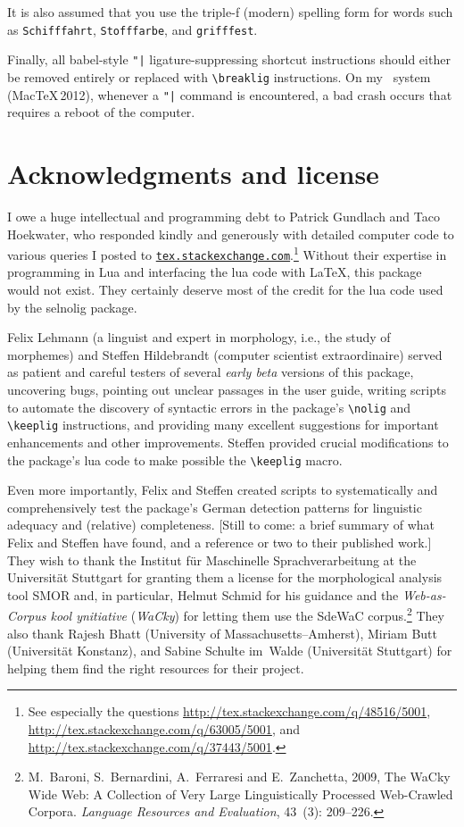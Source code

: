 \documentclass[12pt]{article}
\newcommand{\pkg}[1]{\textsf{#1}}
\newcommand{\cmmd}[1]{\texttt{\textbackslash #1}}
\begin{document}
It is also assumed that you use the triple-f (modern) spelling form for words such as \texttt{Schifffahrt}, \texttt{Stofffarbe}, and \texttt{grifffest}.

Finally, all \pkg{babel}-style \Verb+"|+ ligature-suppressing shortcut instructions should either be removed entirely or replaced with \Verb+\breaklig+ instructions. On my \LuaLaTeX\ system (MacTeX\,2012), whenever a \Verb+"|+ command is encountered, a bad crash occurs that requires a reboot of the computer.


\section{Acknowledgments and license}

I owe a huge intellectual and programming debt to Patrick Gundlach and Taco Hoekwater, who responded kindly and generously with detailed computer code to various queries I posted to \href{http://tex.stackexchange.com}{\texttt{tex.stackexchange.com}}.\footnote{See especially the questions \url{http://tex.stackexchange.com/q/48516/5001}, \url{http://tex.stackexchange.com/q/63005/5001}, and
\url{http://tex.stackexchange.com/q/37443/5001}.} Without their expertise in programming in Lua and interfacing the lua code with \LaTeX, this package would not exist. They certainly deserve most of the credit for the lua code used by the \pkg{selnolig} package.

Felix Lehmann (a linguist and expert in morphology, i.e., the study of morphemes) and Steffen Hildebrandt (computer scientist extraordinaire) served as patient and careful testers of several \emph{early beta} versions of this package, uncovering bugs, pointing out unclear passages in the user guide, writing scripts to automate the discovery of syntactic errors in the package's \cmmd{nolig} and \cmmd{keeplig} instructions, and providing many excellent suggestions for important enhancements and other improvements. Steffen provided crucial modifications to the package's lua code to make possible the \cmmd{keeplig} macro. 

Even more importantly, Felix and Steffen created scripts to systematically and comprehensively test the package's German detection patterns for linguistic adequacy and (relative) completeness.
[Still to come: a brief summary of what Felix and Steffen have found, and a reference or two to their published work.] They wish to thank the Institut für Maschinelle Sprachverarbeitung at the Universität Stuttgart for granting them a license for the morphological analysis tool SMOR and, in particular, Helmut Schmid for his guidance and the \emph{Web-as-Corpus kool ynitiative} (\emph{WaCky}) for letting them use the SdeWaC corpus.\footnote{M.~Baroni, S.~Bernardini, A.~Ferraresi and E.~Zanchetta, 2009, The WaCky Wide Web: A Collection of Very Large Linguistically Processed Web-Crawled Corpora. \emph{Language Resources and Evaluation}, 43~(3): 209--226.} They also thank Rajesh Bhatt (University of Massachusetts--Amherst), Miriam Butt (Universität Konstanz), and Sabine Schulte im~Walde (Universität Stuttgart) for helping them find the right resources for their project.
\end{document}
